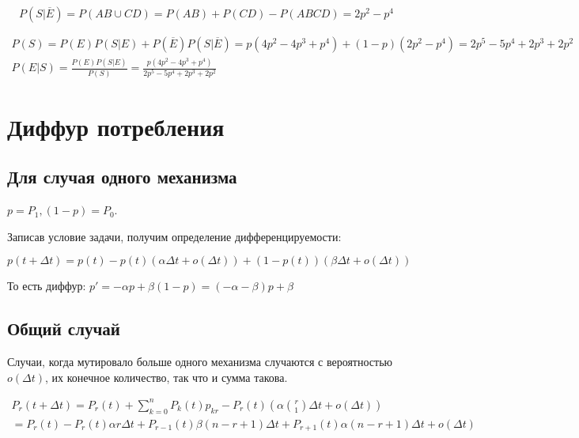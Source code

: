\documentclass[12pt, a4paper]{article}
\begin{document}
\begin{equation}
  P(S | \overline{E}) = P(AB \cup CD) = P(AB) + P(CD) - P(ABCD) = 2p^2 - p^4
\end{equation}

\begin{gather}
  P(S) = P(E) P(S | E) + P(\overline{E}) P(S | \overline{E}) = p (4 p^2 - 4 p^3 + p^4) + (1 - p)(2p^2 - p^4) = 2 p^5 - 5 p^4 + 2 p^3 + 2 p^2 \\
  P(E | S) = \frac{P(E) P(S | E)}{P(S)} = \frac{p (4 p^2 - 4 p^3 + p^4)}{2 p^5 - 5 p^4 + 2 p^3 + 2 p^2}
\end{gather}



\section{Диффур потребления}

\subsection{Для случая одного механизма}

$p = P_1, (1 - p) = P_0$.

Записав условие задачи, получим определение дифференцируемости:

\begin{equation}
  p(t + \Delta t) = p(t) - p(t) (\alpha \Delta t + o(\Delta t)) + 
  (1 - p(t)) (\beta \Delta t + o(\Delta t))
\end{equation}

То есть диффур: $p' = -\alpha p + \beta(1 - p) = (-\alpha - \beta) p + \beta$


\subsection{Общий случай}

Случаи, когда мутировало больше одного механизма случаются с вероятностью $o(\Delta t)$,
их конечное количество, так что и сумма такова.

\begin{multline}
  P_r(t + \Delta t) = P_r(t) + \sum_{k = 0}^n P_k(t) p_{kr} - P_r(t) \left(\alpha \binom{r}{1} \Delta t + o(\Delta t)\right) \\
  = P_r(t) - P_r(t) \alpha r \Delta t + P_{r - 1}(t) \beta (n - r + 1) \Delta t + P_{r + 1}(t) \alpha (n - r + 1) \Delta t + o(\Delta t) 
\end{multline}
\end{document}
